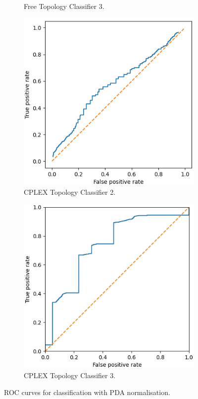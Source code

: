 \begin{figure}[H]
\begin{subfigure}[H]{0.475\textwidth}
        \caption{Free Topology Classifier 3.}
    \end{subfigure}
    \begin{subfigure}[H]{0.475\textwidth}
        \includegraphics[width=\textwidth]{figs/results/metric_normilisation/norway_ac2.png}
        \caption{CPLEX Topology Classifier 2.}
    \end{subfigure}
    \begin{subfigure}[H]{0.475\textwidth}
        \includegraphics[width=\textwidth]{figs/results/metric_normilisation/norway_ac3.png}
        \caption{CPLEX Topology Classifier 3.}
    \end{subfigure}
    \caption{ROC curves for classification with PDA normalisation.}
    \label{fig:RmetricnormROCcurves}
\end{figure}

